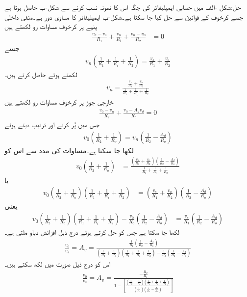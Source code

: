 حل:شکل -الف میں حسابی ایمپلیفائر کی جگہ اس کا نمونہ نسب کرنے سے شکل-ب حاصل ہوتا ہے جسے کرخوف کے قوانین سے حل کیا جا سکتا ہے۔شکل-ب  ایمپلیفائر کا مساوی دور ہے۔منفی داخلی پنیے  پر کرخوف مساوات رو لکھتے ہیں
\begin{align*}
\frac{v_n-v_s}{R_1}+\frac{v_n}{R_i}+\frac{v_n-v_0}{R_2}&=0
\end{align*}
جسے
\begin{align*}
v_n\left(\frac{1}{R_1}+\frac{1}{R_i}+\frac{1}{R_2}\right)=\frac{v_s}{R_1}+\frac{v_o}{R_2}
\end{align*}
لکھتے ہوئے  حاصل کرتے ہیں۔
\begin{align}\label{مساوات_حسابی_منفی_پنیا_الف}
v_n=\frac{\frac{v_s}{R_1}+\frac{v_o}{R_2}}{\frac{1}{R_1}+\frac{1}{R_i}+\frac{1}{R_2}}
\end{align}
خارجی جوڑ پر کرخوف مساوات رو لکھتے ہیں
\begin{align*}
\frac{v_0-v_n}{R_2}+\frac{v_0-A_d v_d}{R_o}=0
\end{align*}
جس میں  پُر کرتے اور ترتیب دیتے ہوئے
\begin{align*}
v_0\left(\frac{1}{R_2}+\frac{1}{R_o}\right)=v_n\left(\frac{1}{R_2}-\frac{A_d}{R_o}\right)
\end{align*}
لکھا جا سکتا ہے۔مساوات  کی مدد سے اس کو
\begin{align*}
v_0\left(\frac{1}{R_2}+\frac{1}{R_o}\right)&=\frac{\left(\frac{v_s}{R_1}+\frac{v_o}{R_2}\right)\left(\frac{1}{R_2}-\frac{A_d}{R_o}\right)}{\frac{1}{R_1}+\frac{1}{R_i}+\frac{1}{R_2}}
\end{align*}
یا
\begin{align*}
v_0\left(\frac{1}{R_2}+\frac{1}{R_o}\right)\left(\frac{1}{R_1}+\frac{1}{R_i}+\frac{1}{R_2}\right)&=\left(\frac{v_s}{R_1}+\frac{v_o}{R_2}\right)\left(\frac{1}{R_2}-\frac{A_d}{R_o}\right)
\end{align*}
یعنی
\begin{align*}
v_0\left(\frac{1}{R_2}+\frac{1}{R_o}\right)\left(\frac{1}{R_1}+\frac{1}{R_i}+\frac{1}{R_2}\right)-\frac{v_0}{R_o}\left(\frac{1}{R_2}-\frac{A_d}{R_o}\right)&=\frac{v_s}{R_1}\left(\frac{1}{R_2}-\frac{A_d}{R_o}\right)
\end{align*}
لکھا جا سکتا ہے جس کو حل کرتے ہوئے درج ذیل افزائش دباو  ملتی ہے۔
\begin{align*}
\frac{v_0}{v_s}=A_v=\frac{\frac{1}{R_1} \left(\frac{1}{R_2}-\frac{A_d}{R_o}\right)}{\left(\frac{1}{R_2}+\frac{1}{R_o}\right)\left(\frac{1}{R_1}+\frac{1}{R_i}+\frac{1}{R_2}\right)-\frac{1}{R_2}\left(\frac{1}{R_2}-\frac{A_d}{R_o}\right)}
\end{align*}
اس کو درج ذیل صورت میں لکھ سکتے ہیں۔
\begin{align}\label{مساوات_حسابی_منفی_الف}
\frac{v_0}{v_s}=A_v=\frac{-\frac{R_2}{R_1}}{1-\left[\frac{\left(\frac{1}{R_2}+\frac{1}{R_o}\right)\left(\frac{1}{R_1}+\frac{1}{R_i}+\frac{1}{R_2}\right)}{\left(\frac{1}{R_2}\right)\left(\frac{1}{R_2}-\frac{A_d}{R_o}\right)}\right]}
\end{align}

